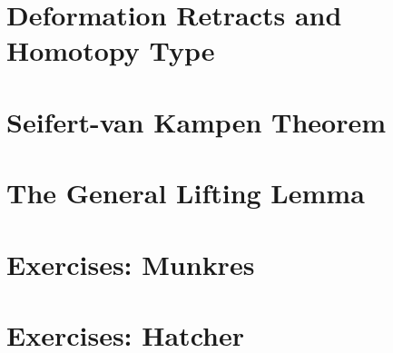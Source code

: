 \documentclass[10pt, oneside]{amsart}
\begin{document}
    \section{Deformation Retracts and Homotopy Type}

    \section{Seifert-van Kampen Theorem}

    \section{The General Lifting Lemma}

    \section{Exercises: Munkres}

    \section{Exercises: Hatcher}
\end{document}
